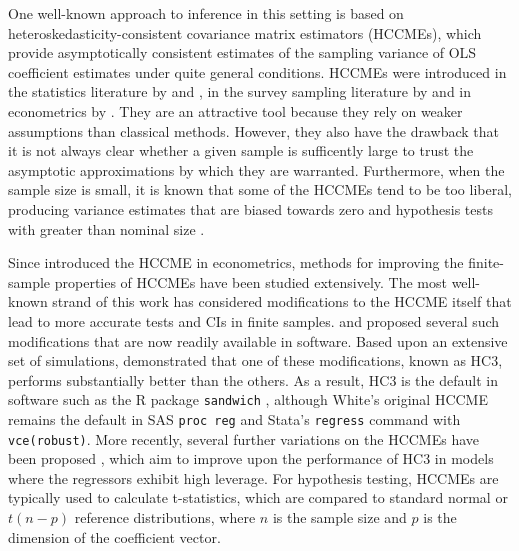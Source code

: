 \documentclass[12pt]{article}\usepackage[]{graphicx}\usepackage[]{color}
\begin{document}
One well-known approach to inference in this setting is based on heteroskedasticity-consistent covariance matrix estimators (HCCMEs), which provide asymptotically consistent estimates of the sampling variance of OLS coefficient estimates under quite general conditions. HCCMEs were introduced in the statistics literature by \citet{Huber1967behavior} and \citet{Eicker1967limit}, in the survey sampling literature by and in econometrics by \citet{White1980heteroskedasticity}. They are an attractive tool because they rely on weaker assumptions than classical methods. However, they also have the drawback that it is not always clear whether a given sample is sufficently large to trust the asymptotic approximations by which they are warranted. Furthermore, when the sample size is small, it is known that some of the HCCMEs tend to be too liberal, producing variance estimates that are biased towards zero and hypothesis tests with greater than nominal size \citep{Long2000using}. 

Since \citet{White1980heteroskedasticity} introduced the HCCME in econometrics, methods for improving the finite-sample properties of HCCMEs have been studied extensively.  
The most well-known strand of this work has considered modifications to the HCCME itself that lead to more accurate tests and CIs in finite samples. \citet{MacKinnon1985some} and \citet{Davidson1993estimation} proposed several such modifications that are now readily available in software. 
Based upon an extensive set of simulations, \citet{Long2000using} demonstrated that one of these modifications, known as HC3, performs substantially better than the others.
As a result, HC3 is the default in software such as the R package \texttt{sandwich} \citep{Zeileis2004econometric}, although White's original HCCME remains the default in SAS \texttt{proc reg} and Stata's \texttt{regress} command with \texttt{vce(robust)}. 
More recently, several further variations on the HCCMEs have been proposed \citep{Cribari-Neto2004asymptotic, Cribari-Neto2007inference, Cribari-Neto2011new}, which aim to improve upon the performance of HC3 in models where the regressors exhibit high leverage. 
For hypothesis testing, HCCMEs are typically used to calculate t-statistics, which are compared to standard normal or $t(n - p)$ reference distributions, where $n$ is the sample size and $p$ is the dimension of the coefficient vector.
\end{document}
